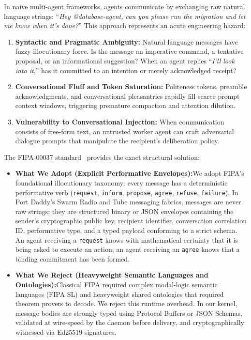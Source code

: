 In naive multi-agent frameworks, agents communicate by exchanging raw natural language strings: ``\emph{Hey @database-agent, can you please run the migration and let me know when it's done?}'' This approach represents an acute engineering hazard:
\begin{enumerate}[leftmargin=1.8em,itemsep=2pt]
  \item \textbf{Syntactic and Pragmatic Ambiguity:} Natural language messages have fuzzy illocutionary force. Is the message an imperative command, a tentative proposal, or an informational suggestion? When an agent replies ``\emph{I'll look into it},'' has it committed to an intention or merely acknowledged receipt?
  \item \textbf{Conversational Fluff and Token Saturation:} Politeness tokens, preamble acknowledgments, and conversational pleasantries rapidly fill scarce prompt context windows, triggering premature compaction and attention dilution.
  \item \textbf{Vulnerability to Conversational Injection:} When communication consists of free-form text, an untrusted worker agent can craft adversarial dialogue prompts that manipulate the recipient's deliberation policy.
\end{enumerate}

The FIPA-00037 standard~ provides the exact structural solution:
\begin{itemize}[leftmargin=1.8em,itemsep=2pt]
  \item \textbf{What We Adopt (Explicit Performative Envelopes):}\enspace We adopt FIPA's foundational illocutionary taxonomy: every message has a deterministic performative verb (\texttt{request}, \texttt{inform}, \texttt{propose}, \texttt{agree}, \texttt{refuse}, \texttt{failure}). In Port Daddy's Swarm Radio and Tube messaging fabrics, messages are never raw strings; they are structured binary or JSON envelopes containing the sender's cryptographic public key, recipient identifier, conversation correlation ID, performative type, and a typed payload conforming to a strict schema. An agent receiving a \texttt{request} knows with mathematical certainty that it is being asked to execute an action; an agent receiving an \texttt{agree} knows that a binding commitment has been formed.
  \item \textbf{What We Reject (Heavyweight Semantic Languages and Ontologies):}\enspace Classical FIPA required complex modal-logic semantic languages (FIPA SL) and heavyweight shared ontologies that required theorem provers to decode. We reject this runtime overhead. In our kernel, message bodies are strongly typed using Protocol Buffers or JSON Schemas, validated at wire-speed by the daemon before delivery, and cryptographically witnessed via Ed25519 signatures.
\end{itemize}

